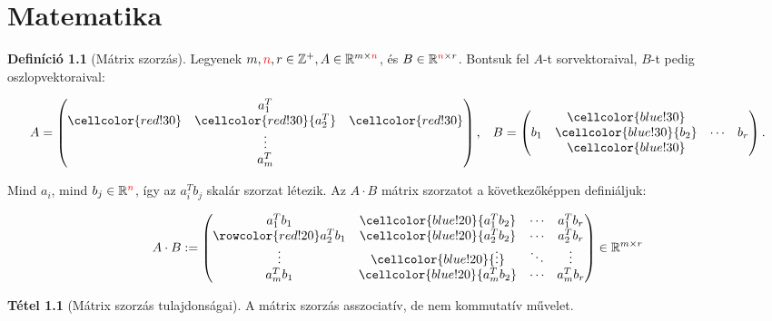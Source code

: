 \documentclass[twocolumn]{report}
\theoremstyle{definition}
\newtheorem{tet}{Tétel}
\newtheorem{defin}{Definíció}
\begin{document}
\chapter{Matematika}

\begin{defin}[Mátrix szorzás]
Legyenek $m,\textcolor{red}{n},r \in \mathbb{Z}^+, A \in \mathbb{R}^{m \times {\textcolor{red}{n}}}$, és $B \in \mathbb{R}^{{\textcolor{red}{n}} \times  r}$.
Bontsuk fel $A$-t sorvektoraival, $B$-t pedig oszlopvektoraival:
\end{defin}

\begin{equation}
A=\begin{pmatrix}
 & a_1^T & \\
\cellcolor{red!30} & \cellcolor{red!30}{a_2^T} & \cellcolor{red!30}\\
 & \vdots & \\
 & a_m^T &
\end{pmatrix}\text{,}
\quad
B=\begin{pmatrix}
 & \cellcolor{blue!30}\\
 b_1 & {\cellcolor{blue!30}{b_2}} & \cdots & b_r\\
 & \cellcolor{blue!30}\\
 \end{pmatrix}\text{.}
\end{equation}

Mind $a_i$, mind $b_j \in \mathbb{R}^{\textcolor{red}{n}}$, így az $a_i^Tb_j$ skalár szorzat létezik. Az $A \cdot B$ mátrix szorzatot a következőképpen definiáljuk:

\begin{equation}
A \cdot B :=
\begin{pmatrix}
a_1^Tb_1 & \cellcolor{blue!20}{a_1^Tb_2} & \cdots & a_1^Tb_r\\
\rowcolor{red!20}
a_2^Tb_1 & \cellcolor{blue!20}{a_2^Tb_2} & \cdots & a_2^Tb_r\\
\vdots & \cellcolor{blue!20}{\vdots} & \ddots & \vdots\\
a_m^Tb_1 & \cellcolor{blue!20}{a_m^Tb_2} & \cdots & a_m^Tb_r\\
\end{pmatrix} \in \mathbb{R}^{m \times r}
\end{equation}

\begin{tet}[Mátrix szorzás tulajdonságai]
A mátrix szorzás asszociatív, de nem kommutatív művelet.
\end{tet}
\end{document}
